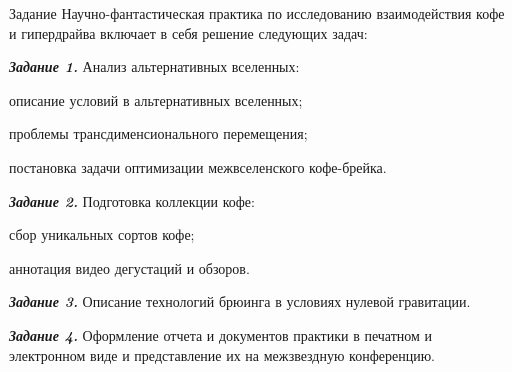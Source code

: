 \begin{addition}{Задание}
  Научно-фантастическая практика по исследованию взаимодействия кофе и гипердрайва включает в себя решение следующих задач:

  \textit{\textbf{Задание 1.}} Анализ альтернативных вселенных:

  \begin{vvsu_list}
    \item описание условий в альтернативных вселенных;
    \item проблемы трансдименсионального перемещения;
    \item постановка задачи оптимизации межвселенского кофе-брейка.
  \end{vvsu_list}

  \textit{\textbf{Задание 2.}} Подготовка коллекции кофе:

  \begin{vvsu_list}
    \item сбор уникальных сортов кофе;
    \item аннотация видео дегустаций и обзоров.
  \end{vvsu_list}

  \textit{\textbf{Задание 3.}} Описание технологий брюинга в условиях нулевой гравитации.

  \textit{\textbf{Задание 4.}} Оформление отчета и документов практики в печатном и электронном виде и представление их на межзвездную конференцию.
\end{addition}